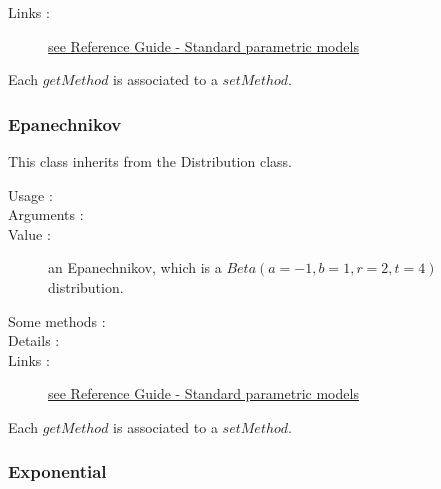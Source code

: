 \begin{description}
\begin{description}
  \end{description}

\item[Links :]  \rule{0pt}{1em}
  \href{OpenTURNS_ReferenceGuide.pdf}{see Reference Guide - Standard parametric models}
\end{description}

Each  $getMethod$  is associated to a $setMethod$.



\newpage \subsubsection{Epanechnikov}


This class inherits from the Distribution class.

\begin{description}

\item[Usage :]

\item[Arguments :]  \rule{0pt}{1em}

\item[Value :] an Epanechnikov, which is a $Beta (a=-1, b=1, r=2, t=4)$ distribution.

\item[Some methods :]  \rule{0pt}{1em}



\item[Details :]  \rule{0pt}{1em}

\item[Links :]  \rule{0pt}{1em}
  \href{OpenTURNS_ReferenceGuide.pdf}{see Reference Guide - Standard parametric models}
\end{description}

Each  $getMethod$  is associated to a $setMethod$.


\newpage \subsubsection{Exponential}


